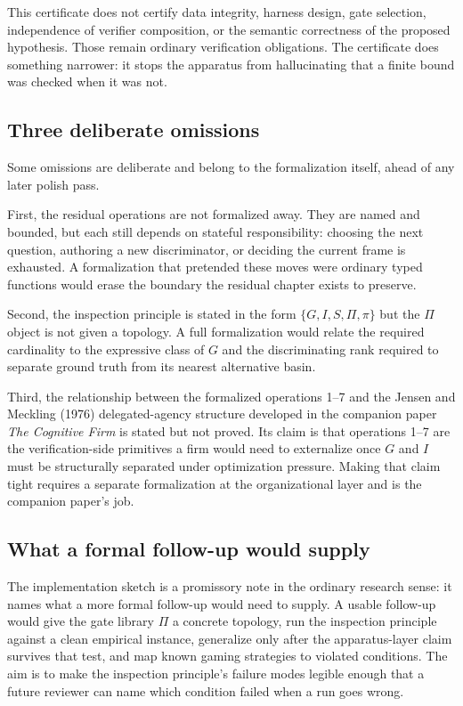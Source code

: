\documentclass[
  11pt,
]{article}
\begin{document}
This certificate does not certify data integrity, harness design, gate
selection, independence of verifier composition, or the semantic
correctness of the proposed hypothesis. Those remain ordinary
verification obligations. The certificate does something narrower: it
stops the apparatus from hallucinating that a finite bound was checked
when it was not.

\subsection{Three deliberate
omissions}\label{three-deliberate-omissions}

Some omissions are deliberate and belong to the formalization itself,
ahead of any later polish pass.

First, the residual operations are not formalized away. They are named
and bounded, but each still depends on stateful
responsibility: choosing the next question, authoring a new
discriminator, or deciding the current frame is exhausted. A
formalization that pretended these moves were ordinary typed functions
would erase the boundary the residual chapter exists to preserve.

Second, the inspection principle is stated in the form
\(\{G, I, S, \Pi, \pi\}\) but the \(\Pi\) object is not given a
topology. A full formalization would relate the required cardinality to
the expressive class of \(G\) and the discriminating rank required to
separate ground truth from its nearest alternative basin.

Third, the relationship between the formalized operations 1--7 and the
Jensen and Meckling (1976) delegated-agency structure developed in the
companion paper \emph{The Cognitive Firm} is stated but not proved. Its
claim is that operations 1--7 are the verification-side primitives a firm
would need to externalize once \(G\) and \(I\) must be structurally
separated under optimization pressure. Making that claim tight requires a
separate formalization at the organizational layer and is the companion
paper's job.

\subsection{What a formal follow-up would
supply}\label{what-a-formal-follow-up-would-supply}

The implementation sketch is a promissory note in the ordinary research
sense: it names what a more formal follow-up would need to supply. A
usable follow-up would give the gate library \(\Pi\) a concrete topology,
run the inspection principle against a clean empirical instance,
generalize only after the apparatus-layer claim survives that test, and
map known gaming strategies to violated conditions. The aim is to make the
inspection principle's failure modes legible enough that a future reviewer
can name which condition failed when a run goes wrong.
\end{document}

